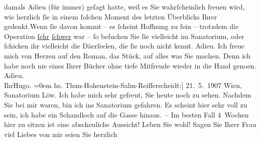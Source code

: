 \begin{ledgroupsized}[t]{13cm}
               damals Adieu (für immer) geſagt hatte, weil es Sie wahrſcheinlich freuen wird, wie
               herzlich ſie in einem ſolchen Moment des letzten Überblicks Ihrer gedenkt.\hspace*{1.5em}Wenn ſie davon kommt – es {\pb}ſcheint Hoffnung zu ſein –
               trotzdem die Operation \uline{ſehr}{ }\uline{ſchwer} war – ſo beſuchen Sie ſie
               vielleicht im Sanatorium, oder
               ſchicken ihr vielleicht die Dä{\geminationm}erſeelen, die ſie noch nicht kennt.\pend
           \pstart
           Adieu. Ich freue mich von Herzen auf den Roman, das Stück, auf
               alles was Sie machen. {\pb}Denn ich
               habe noch nie eines Ihrer Bücher ohne tiefe Mitfreude wieder in die Hand geno{\geminationm}en.\pend
           \pstart
           Adieu.{\\[\baselineskip]}Ihr\spacefill\mbox{Hugo.}\pend
           \leftskip=0em{}{\bigskip}\pstart
           \raggedleft{}{\pb}{[}hs. Thun-Hohenstein-Salm-Reifferscheidt:{]} 21. 5. 1907\pend
           \pstart
           \raggedleft{}Wien, Sanatorium Löw.\pend
           \pstart
           Ich habe mich sehr gefreut, Sie heute noch zu sehen. Nachdem Sie bei mir waren, bin
               ich ins Sanatorium gefahren. Es
               scheint hier sehr voll zu sein, {\kaufmannsund} ich habe ein
               Schandloch auf die Gasse hinaus. –\pend
           \pstart
           Im besten Fall 4 Wochen hier zu sitzen ist eine abscheuliche Aussicht!\pend
           \pstart
           Leben Sie wohl! Sagen Sie Ihrer Frau viel Liebes von mir {\kaufmannsund} seien Sie herzlich

\end{ledgroupsized}
